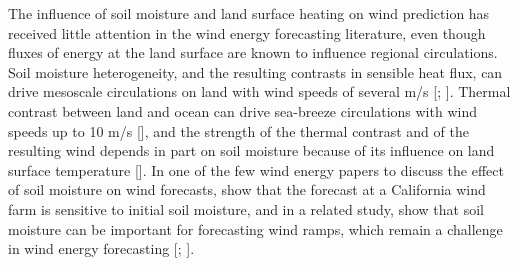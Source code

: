 
The influence of soil moisture and land surface heating on wind prediction has received little attention in the wind energy forecasting literature, even though fluxes of energy at the land surface are known to influence regional circulations.  Soil moisture heterogeneity, and the resulting contrasts in sensible heat flux, can drive mesoscale circulations on land with wind speeds of several m/s [\cite{chen1994impact}; \cite{avissar1998evaluation}].  Thermal contrast between land and ocean can drive sea-breeze circulations with wind speeds up to 10 m/s [\cite{miller2003sea}], and the strength of the thermal contrast and of the resulting wind depends in part on soil moisture because of its influence on land surface temperature [\cite{physick1980numerical}].  In one of the few wind energy papers to discuss the effect of soil moisture on wind forecasts, \cite{marjanovic2014} show that the forecast at a California wind farm is sensitive to initial soil moisture, and in a related study, \cite{wharton2011review} show that soil moisture can be important for forecasting wind ramps, which remain a challenge in wind energy forecasting [\cite{carcangiu2013wind}; \cite{ellis2014predicting}].

